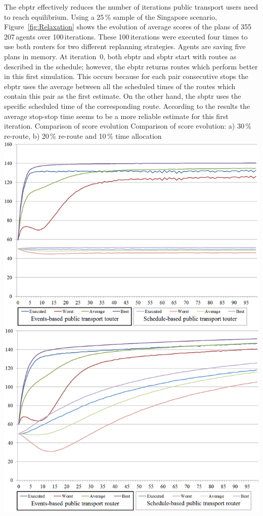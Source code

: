 The \gls{ebptr} effectively reduces the number of iterations public transport users need to reach equilibrium. Using a 25\,\% sample of the Singapore scenario, Figure~\ref{fig:Relaxation} shows the evolution of average scores of the plans of 355\,207\,agents over 100\,iterations. These 100\,iterations were executed four times to use both routers for two different replanning strategies. Agents are saving five plans in memory. At iteration~0, both \gls{ebptr} and \gls{sbptr} start with routes as described in the schedule; however, the \gls{ebptr} returns routes which perform better in this first simulation. This occurs because for each pair consecutive stops the \gls{ebptr} uses the average between all the scheduled times of the routes which contain this pair as the first estimate. On the other hand, the \gls{sbptr} uses the specific scheduled time of the corresponding route. According to the results the average stop-stop time seems to be a more reliable estimate for this first iteration.
\createfigure
{Comparison of score evolution}
{Comparison of score evolution: a) 30\,\% re-route, b) 20\,\% re-route and 10\,\% time allocation}
{\label{fig:Relaxation}}
{\includegraphics[width=1.0\textwidth]{extending/figures/ebr/Relaxation.png}}
{}

